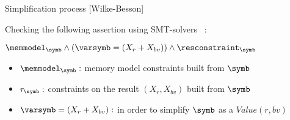 \begin{frame}{Simplification process [Wilke-Besson]}
      \medskip
      Checking the following assertion using SMT-solvers~ :\\
      \begin{center}
      $\memmodel_\symb \wedge (\varsymb = (X_r + X_{bv})) \wedge \resconstraint_\symb $
      \end{center}
      \begin{itemize}
      \item $\memmodel_\symb:$ memory model constraints built from $\symb$
      \item $\tau_\symb : $ constraints on the result $(X_r, X_{bv})$ built from $\symb$
      \item $\varsymb = (X_r + X_{bv}): $ in order to simplify $\symb$ as a $Value(r,bv)$
      \end{itemize}

\end{frame}


